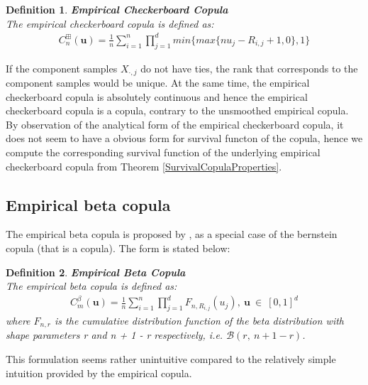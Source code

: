 \documentclass[12pt]{report}
\newtheorem{definition}{Definition}[subsection]
\newcommand{\1}{\mathbf{1}}
\begin{document}
\begin{flushleft}
\begin{definition}\label{ECCDef}
\textbf{Empirical Checkerboard Copula} \\
The empirical checkerboard copula is defined as:
\begin{align*}
C_{n}^{\boxplus}(\textbf{u}) = \frac{1}{n} \sum\limits_{i = 1}^{n} \prod\limits_{j = 1}^{d} min \{ max \{ n u_{j} - R_{i,j} + 1, 0 \}, 1 \}
\end{align*}
\end{definition}

If the component samples $X_{\cdot,j}$ do not have ties, the rank that corresponds to the component samples would be unique. At the same time, the empirical checkerboard copula is absolutely continuous and hence the empirical checkerboard copula is a copula, contrary to the unsmoothed empirical copula. By observation of the analytical form of the empirical checkerboard copula, it does not seem to have a obvious form for survival functon of the copula, hence we compute the corresponding survival function of the underlying empirical checkerboard copula from Theorem \ref{SurvivalCopulaProperties}.

\newpage
\subsection{Empirical beta copula}
\vspace{0.5cm}

The empirical beta copula is proposed by \cite{SegersEBC}, as a special case of the bernstein copula (that is a copula). The form is stated below:

\begin{definition}\label{EBCDef}
\textit{\normalfont\parencite{SegersEBC}} \:
\textbf{Empirical Beta Copula} \\
The empirical beta copula is defined as:
\begin{align*}
C^{\beta}_{m}(\textbf{u}) = \frac{1}{n} \sum\limits_{i = 1}^{n} \prod\limits_{j = 1}^{d} F_{n,R_{i,j}}(u_{j}), \: \textbf{u} \: \in \: [0,1]^{d}
\end{align*}
where $F_{n,r}$ is the cumulative distribution function of the beta distribution with shape parameters r and n + 1 - r respectively, i.e. $\mathcal{B}(r, \:n + 1 - r)$.
\end{definition}

This formulation seems rather unintuitive compared to the relatively simple intuition provided by the empirical copula. \\


\end{flushleft}
\end{document}
